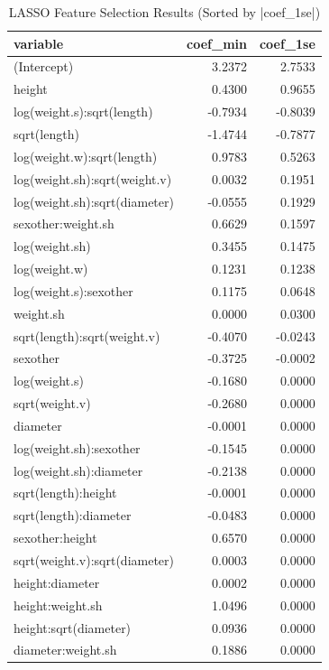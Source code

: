 \documentclass[12pt]{article}
\begin{document}
	\begin{table}[H]
		\centering
		\caption{\label{tab:lasso}LASSO Feature Selection Results (Sorted by |coef\_1se|)}
		\begin{tabular}{lrr}
			\toprule
			variable & coef\_min & coef\_1se\\
			\midrule
			(Intercept)                 & 3.2372  & 2.7533\\
			height                      & 0.4300  & 0.9655\\
			log(weight.s):sqrt(length)  & -0.7934 & -0.8039\\
			sqrt(length)                & -1.4744 & -0.7877\\
			log(weight.w):sqrt(length)  & 0.9783  & 0.5263\\
			log(weight.sh):sqrt(weight.v) & 0.0032 & 0.1951\\
			log(weight.sh):sqrt(diameter) & -0.0555 & 0.1929\\
			sexother:weight.sh          & 0.6629  & 0.1597\\
			log(weight.sh)              & 0.3455  & 0.1475\\
			log(weight.w)               & 0.1231  & 0.1238\\
			log(weight.s):sexother      & 0.1175  & 0.0648\\
			weight.sh                   & 0.0000  & 0.0300\\
			sqrt(length):sqrt(weight.v) & -0.4070 & -0.0243\\
			sexother                    & -0.3725 & -0.0002\\
			log(weight.s)               & -0.1680 & 0.0000\\
			sqrt(weight.v)              & -0.2680 & 0.0000\\
			diameter                    & -0.0001 & 0.0000\\
			log(weight.sh):sexother     & -0.1545 & 0.0000\\
			log(weight.sh):diameter     & -0.2138 & 0.0000\\
			sqrt(length):height         & -0.0001 & 0.0000\\
			sqrt(length):diameter       & -0.0483 & 0.0000\\
			sexother:height             & 0.6570  & 0.0000\\
			sqrt(weight.v):sqrt(diameter) & 0.0003 & 0.0000\\
			height:diameter             & 0.0002  & 0.0000\\
			height:weight.sh            & 1.0496  & 0.0000\\
			height:sqrt(diameter)       & 0.0936  & 0.0000\\
			diameter:weight.sh          & 0.1886  & 0.0000\\
			\bottomrule
		\end{tabular}
	\end{table}
	
\end{document}
